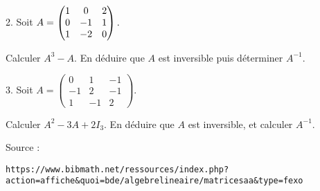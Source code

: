\vspace{.323cm}
\begin{minipage}[c]{.45\linewidth}
2. Soit $ A=\begin{pmatrix} 1 & 0 & 2 \cr
0 & -1 & 1 \cr
1 & -2 & 0 \cr \end{pmatrix} .$
\end{minipage}
\hfill
\begin{minipage}[c]{.45\linewidth}
Calculer $A^3-A .$ En déduire
que $ A $ est inversible puis déterminer $ A^{-1} .$ 
\end{minipage}

\vspace{.323cm}
\begin{minipage}[c]{.45\linewidth}
3. Soit $A=\begin{pmatrix} 
0&1&-1\\-1&2&-1\\1&-1&2
\end{pmatrix}$.
\end{minipage}
\hfill
\begin{minipage}[c]{.45\linewidth}
Calculer $A^2-3A+2I_3$. En déduire que $A$ est inversible, et calculer $A^{-1}$.
\end{minipage}

\vspace{.323cm}
{\scriptsize Source : 

\texttt{https://www.bibmath.net/ressources/index.php?action=affiche\&quoi=bde/algebrelineaire/matricesaa\&type=fexo}}


